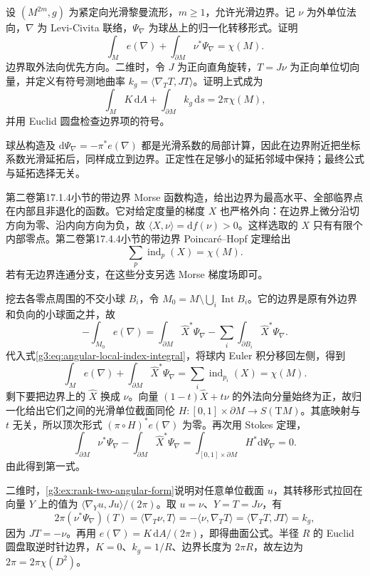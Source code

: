 \begin{exercise}\label{g3:ex:gauss-bonnet-smooth-boundary}
	设 \((M^{2m},g)\) 为紧定向光滑黎曼流形，\(m\ge1\)，允许光滑边界。记 \(\nu\) 为外单位法向，\(\nabla\) 为 Levi-Civita 联络，\(\Psi_\nabla\) 为球丛上的归一化转移形式。证明
	\[
		\int_M e(\nabla)+\int_{\partial M}\nu^*\Psi_\nabla=\chi(M).
	\]
	边界取外法向优先方向。二维时，令 \(J\) 为正向直角旋转，\(T=J\nu\) 为正向单位切向量，并定义有符号测地曲率
	\(k_g=\langle\nabla_TT,JT\rangle\)。证明上式成为
	\[
		\int_M K\,\mathrm dA+\int_{\partial M}k_g\,\mathrm ds=2\pi\chi(M),
	\]
	并用 Euclid 圆盘检查边界项的符号。
\end{exercise}
\begin{solution}
	球丛构造及 \(\mathrm d\Psi_\nabla=-\pi^*e(\nabla)\) 都是光滑系数的局部计算，因此在边界附近把坐标系数光滑延拓后，同样成立到边界。正定性在足够小的延拓邻域中保持；最终公式与延拓选择无关。

	第二卷第17.1.4小节的带边界 Morse 函数构造，给出边界为最高水平、全部临界点在内部且非退化的函数。它对给定度量的梯度 \(X\) 也严格外向：在边界上微分沿切方向为零、沿内向方向为负，故 \(\langle X,\nu\rangle=\mathrm df(\nu)>0\)。这样选取的 \(X\) 只有有限个内部零点。第二卷第17.4.4小节的带边界 Poincaré--Hopf 定理给出
	\[
		\sum_p\operatorname{ind}_p(X)=\chi(M).
	\]
	若有无边界连通分支，在这些分支另选 Morse 梯度场即可。

	挖去各零点周围的不交小球 \(B_i\)，令 \(M_0=M\setminus\bigcup_i\operatorname{Int}B_i\)。它的边界是原有外边界和负向的小球面之并，故
	\[
		-\int_{M_0}e(\nabla)
		=\int_{\partial M}\widehat X^*\Psi_\nabla
		-\sum_i\int_{\partial B_i}\widehat X^*\Psi_\nabla.
	\]
	代入式\eqref{g3:eq:angular-local-index-integral}，将球内 Euler 积分移回左侧，得到
	\[
		\int_Me(\nabla)+\int_{\partial M}\widehat X^*\Psi_\nabla
		=\sum_i\operatorname{ind}_{p_i}(X)=\chi(M).
	\]
	剩下要把边界上的 \(\widehat X\) 换成 \(\nu\)。向量 \((1-t)\widehat X+t\nu\) 的外法向分量始终为正，故归一化给出它们之间的光滑单位截面同伦 \(H:[0,1]\times\partial M\to S(\mathrm TM)\)。其底映射与 \(t\) 无关，所以顶次形式 \((\pi\circ H)^*e(\nabla)\) 为零。再次用 Stokes 定理，
	\[
		\int_{\partial M}\nu^*\Psi_\nabla
		-\int_{\partial M}\widehat X^*\Psi_\nabla
		=\int_{[0,1]\times\partial M}H^*\mathrm d\Psi_\nabla=0.
	\]
	由此得到第一式。

	二维时，\cref{g3:ex:rank-two-angular-form}说明对任意单位截面 \(u\)，其转移形式拉回在向量 \(Y\) 上的值为
	\(\langle\nabla_Yu,Ju\rangle/(2\pi)\)。取 \(u=\nu\)、\(Y=T=J\nu\)，有
	\[
		2\pi(\nu^*\Psi_\nabla)(T)
		=\langle\nabla_T\nu,T\rangle
		=-\langle\nu,\nabla_TT\rangle
		=\langle\nabla_TT,JT\rangle=k_g,
	\]
	因为 \(JT=-\nu\)。再用 \(e(\nabla)=K\,\mathrm dA/(2\pi)\)，即得曲面公式。半径 \(R\) 的 Euclid 圆盘取逆时针边界，\(K=0\)、\(k_g=1/R\)、边界长度为 \(2\pi R\)，故左边为 \(2\pi=2\pi\chi(D^2)\)。
\end{solution}

